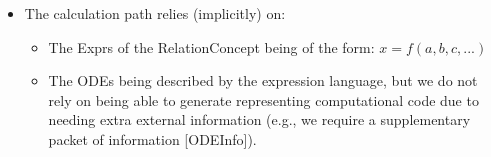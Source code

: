 \begin{itemize}
      \item The calculation path relies (implicitly) on:
            \begin{itemize}

                  \item The Exprs of the RelationConcept being of the form: $x =
                              f(a,b,c,...)$

                  \item The ODEs being described by the expression language, but
                        we do not rely on being able to generate representing
                        computational code due to needing extra external
                        information (e.g., we require a supplementary packet of
                        information [ODEInfo]).

            \end{itemize}

\end{itemize}



